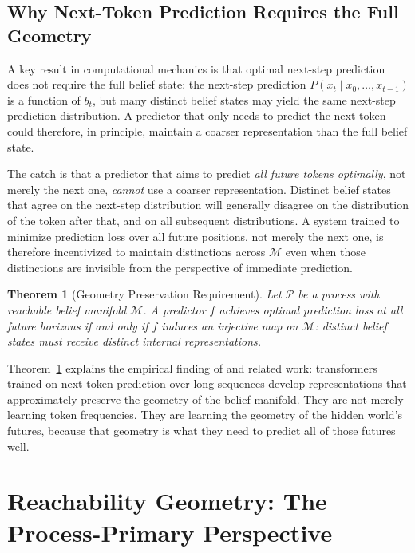 \documentclass[12pt, a4paper]{article}
\theoremstyle{plain}
\newtheorem{theorem}{Theorem}[section]
\theoremstyle{definition}
\theoremstyle{remark}
\begin{document}
\subsection{Why Next-Token Prediction Requires the Full Geometry}

A key result in computational mechanics is that optimal next-step prediction
does not require the full belief state: the next-step prediction
$P(x_t \mid x_0, \ldots, x_{t-1})$ is a function of $b_t$, but many
distinct belief states may yield the same next-step prediction distribution.
A predictor that only needs to predict the next token could therefore, in
principle, maintain a coarser representation than the full belief state.

The catch is that a predictor that aims to predict \emph{all future tokens
optimally}, not merely the next one, \emph{cannot} use a coarser
representation. Distinct belief states that agree on the next-step distribution
will generally disagree on the distribution of the token after that, and on
all subsequent distributions. A system trained to minimize prediction loss
over all future positions, not merely the next one, is therefore incentivized
to maintain distinctions across $\mathcal{M}$ even when those distinctions
are invisible from the perspective of immediate prediction.

\begin{theorem}[Geometry Preservation Requirement]
\label{thm:geom-pres}
Let $\mathcal{P}$ be a process with reachable belief manifold $\mathcal{M}$.
A predictor $f$ achieves optimal prediction loss at all future horizons if
and only if $f$ induces an injective map on $\mathcal{M}$: distinct belief
states must receive distinct internal representations.
\end{theorem}

Theorem~\ref{thm:geom-pres} explains the empirical finding of \citet{shai2025}
and related work: transformers trained on next-token prediction over long
sequences develop representations that approximately preserve the geometry
of the belief manifold. They are not merely learning token frequencies.
They are learning the geometry of the hidden world's futures, because
that geometry is what they need to predict all of those futures well.

\section{Reachability Geometry: The Process-Primary Perspective}
\end{document}
